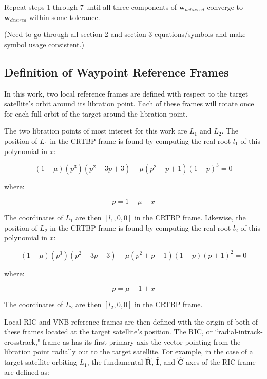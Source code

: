 \documentclass[a4paper]{article}
\begin{document}
Repeat steps 1 through 7 until all three components of \(\mathbf{w}_{achieved}\) converge to \(\mathbf{w}_{desired}\) within some tolerance.

(Need to go through all section 2 and section 3 equations/symbols and make symbol usage consistent.)

\subsection{Definition of Waypoint Reference Frames}

In this work, two local reference frames are defined with respect to the target satellite's orbit around its libration point.  Each of these frames will rotate once for each full orbit of the target around the libration point.

The two libration points of most interest for this work are \(L_1\) and \(L_2\).  The position of \(L_1\) in the CRTBP frame is found by computing the real root \(l_1\) of this polynomial in \(x\):

\begin{equation} \label{eq:L1}
(1 - \mu)(p^3)(p^2 - 3p + 3) - \mu(p^2 + p + 1)(1 - p)^3 = 0
\end{equation}

where:

\begin{equation*}
p = 1 - \mu - x
\end{equation*}

The coordinates of \(L_1\) are then \([l_1, 0, 0]\) in the CRTBP frame.  Likewise, the position of \(L_2\) in the CRTBP frame is found by computing the real root \(l_2\) of this polynomial in \(x\):

\begin{equation} \label{eq:L2}
(1 - \mu)(p^3)(p^2 + 3p + 3) - \mu(p^2 + p + 1)(1 - p)(p + 1)^2 = 0
\end{equation}

where:

\begin{equation*}
p = \mu - 1 + x
\end{equation*}

The coordinates of \(L_2\) are then \([l_2, 0, 0]\) in the CRTBP frame.

Local RIC and VNB reference frames are then defined with the origin of both of these frames located at the target satellite's position.  The RIC, or ``radial-intrack-crosstrack," frame as has its first primary axis the vector pointing from the libration point radially out to the target satellite.  For example, in the case of a target satellite orbiting \(L_1\), the fundamental \(\mathbf{\hat{R}}\), \(\mathbf{\hat{I}}\), and \(\mathbf{\hat{C}}\) axes of the RIC frame are defined as:
\end{document}
